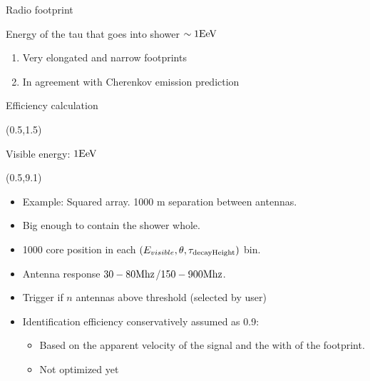 \documentclass[11pt]{beamer}
\begin{document}
\begin{frame}{Radio footprint}
		\scriptsize
		\begin{block}{Energy of the tau that goes into shower $\sim1{\rm EeV}$}
			\begin{center}
			\end{center}
		\end{block}
		\begin{alertblock}{}
			\begin{enumerate}
			 \item Very elongated and narrow footprints
			 \item In agreement with Cherenkov emission prediction
			\end{enumerate}
		\end{alertblock}
\end{frame}


\begin{frame}{Efficiency calculation}
		\scriptsize
		\begin{textblock}{15}(0.5,1.5)
			\begin{block}{\scriptsize Visible energy: $1{\rm EeV}$}
				\begin{center}
				\hfill
				\end{center}
			\end{block}
		\end{textblock}
		\begin{textblock}{15}(0.5,9.1)
			\begin{alertblock}{}
				\begin{itemize}\scriptsize
				 \item Example: Squared array. 1000 m separation between antennas. 
				 \item Big enough to contain the shower whole.
				 \item 1000 core position in each $(E_{visible},\theta,\tau_{\rm decayHeight})$ bin.
				 \item Antenna response $30-80{\rm Mhz}$/$150-900{\rm Mhz}$.
				 \item Trigger if $n$ antennas above threshold (selected by user)
				 \item Identification efficiency conservatively assumed as 0.9:
					 \begin{itemize}\tiny
					 \item Based on the apparent velocity of the signal and the with of the footprint.
					 \item Not optimized yet
					 \end{itemize}
				\end{itemize}
			\end{alertblock}
		\end{textblock}
\end{frame}
\end{document}
